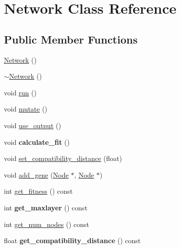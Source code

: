 \hypertarget{classNetwork}{}\section{Network Class Reference}
\label{classNetwork}
\subsection*{Public Member Functions}
\begin{DoxyCompactItemize}
\item 
\hyperlink{classNetwork_a3cc2fb4f8fa4d507077e8da85ce5a1c8}{Network} ()
\item 
\hyperlink{classNetwork_a7a4e19cdb4bf0c7ecf82baa643831492}{$\sim$\+Network} ()
\item 
void \hyperlink{classNetwork_acc13a2e54ee332bb9f288f953ae141ed}{run} ()
\item 
void \hyperlink{classNetwork_aee08409aeb49afa57118ecd46fe78860}{mutate} ()
\item 
void \hyperlink{classNetwork_a7ed4519d18b5a0ef1609c0bcb5293eac}{use\+\_\+output} ()
\item 
void {\bfseries calculate\+\_\+fit} ()\hypertarget{classNetwork_ac1aac2085b9f0ca80d3876a76d5e5bd4}{}\label{classNetwork_ac1aac2085b9f0ca80d3876a76d5e5bd4}

\item 
void \hyperlink{classNetwork_a05aacf7dc8b0a5f5ad450a8967a23bcd}{set\+\_\+compatibility\+\_\+distance} (float)
\item 
void \hyperlink{classNetwork_a3e94eace0d502e87c88bc33cac84cfc4}{add\+\_\+gene} (\hyperlink{classNode}{Node} $\ast$, \hyperlink{classNode}{Node} $\ast$)
\item 
int \hyperlink{classNetwork_a1dc09e49b864fdd2cf44530b765c924b}{get\+\_\+fitness} () const 
\item 
int {\bfseries get\+\_\+maxlayer} () const \hypertarget{classNetwork_a4704867444987554fc7fe24f0a0c4e73}{}\label{classNetwork_a4704867444987554fc7fe24f0a0c4e73}

\item 
int \hyperlink{classNetwork_afaeeda0548935cc3da97b1978884c851}{get\+\_\+num\+\_\+nodes} () const 
\item 
float {\bfseries get\+\_\+compatibility\+\_\+distance} () const \hypertarget{classNetwork_a678c0957f0995c31d06bfb3a19446ccb}{}\label{classNetwork_a678c0957f0995c31d06bfb3a19446ccb}


\end{DoxyCompactItemize}
